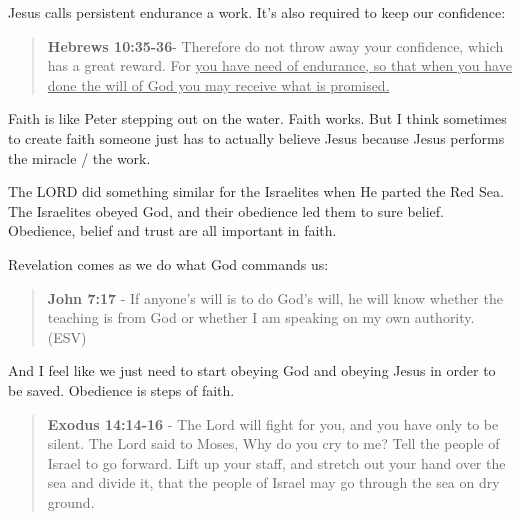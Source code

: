 \documentclass[11pt]{article}
\begin{document}
Jesus calls persistent endurance a work. It's also required to keep our confidence:

\begin{quote}
\textbf{Hebrews 10:35-36}- Therefore do not throw away your confidence, which has a great reward. For \uline{you have need of endurance, so that when you have done the will of God you may receive what is promised.}
\end{quote}

Faith is like Peter stepping out on the water. Faith works. But I think sometimes to create faith someone just has to actually believe Jesus because Jesus performs the miracle / the work.

The LORD did something similar for the Israelites when He parted the Red Sea.
The Israelites obeyed God, and their obedience led them to sure belief.
Obedience, belief and trust are all important in faith.

Revelation comes as we do what God commands us:

\begin{quote}
\textbf{John 7:17} - If anyone's will is to do God's will, he will know whether the teaching is from God or whether I am speaking on my own authority. (ESV)
\end{quote}

And I feel like we just need to start obeying God and obeying Jesus in order to be saved. Obedience is steps of faith.

\begin{quote}
\textbf{Exodus 14:14-16} - The Lord will fight for you, and you have only to be silent.  The Lord said to Moses, Why do you cry to me? Tell the people of Israel to go forward.  Lift up your staff, and stretch out your hand over the sea and divide it, that the people of Israel may go through the sea on dry ground.
\end{quote}
\end{document}
